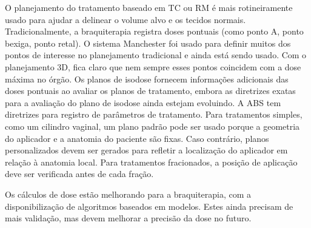\documentclass[11pt,a4paper]{article}
\begin{document}
	O planejamento do tratamento baseado em TC ou RM é mais rotineiramente usado para ajudar a delinear o volume alvo e os tecidos normais. Tradicionalmente, a braquiterapia registra doses pontuais (como ponto A, ponto bexiga, ponto retal). O sistema Manchester foi usado para definir muitos dos pontos de interesse no planejamento tradicional e ainda está sendo usado. Com o planejamento 3D, fica claro que nem sempre esses pontos coincidem com a dose máxima no órgão. Os planos de isodose fornecem informações adicionais das doses pontuais ao avaliar os planos de tratamento, embora as diretrizes exatas para a avaliação do plano de isodose ainda estejam evoluindo. A ABS tem diretrizes para registro de parâmetros de tratamento. Para tratamentos simples, como um cilindro vaginal, um plano padrão pode ser usado porque a geometria do aplicador e a anatomia do paciente são fixas. Caso contrário, planos personalizados devem ser gerados para refletir a localização do aplicador em relação à anatomia local. Para tratamentos fracionados, a posição de aplicação deve ser verificada antes de cada fração.

	Os cálculos de dose estão melhorando para a braquiterapia, com a disponibilização de algoritmos baseados em modelos. Estes ainda precisam de mais validação, mas devem melhorar a precisão da dose no futuro.






\end{document}
